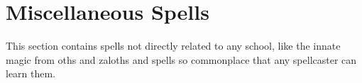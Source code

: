 \section{Miscellaneous Spells}
This section contains spells not directly related to any school, like the innate magic from oths and zaloths and spells so commonplace that any spellcaster can learn them.

%
%
%
